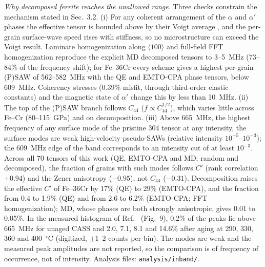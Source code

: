 \documentclass[final,3p,times]{elsarticle}
\begin{document}
\clearpage
\textit{Why decomposed ferrite reaches the unallowed range.} Three checks constrain the mechanism stated in Sec.~3.2. (i) For any coherent arrangement of the $\alpha$ and $\alpha'$ phases the effective tensor is bounded above by their Voigt average \cite{hill1952elastic}, and the per-grain surface-wave speed rises with stiffness, so no microstructure can exceed the Voigt result. Laminate homogenization along $\langle100\rangle$ \cite{backus1962long} and full-field FFT homogenization \cite{moulinec1998numerical} reproduce the explicit MD decomposed tensors to 3--5~MHz (73--84\% of the frequency shift); for Fe--36Cr every scheme gives a highest per-grain (P)SAW of 562--582~MHz with the QE and EMTO-CPA phase tensors, below 609~MHz. Coherency stresses (0.39\% misfit, through third-order elastic constants) and the magnetic state of $\alpha'$ change this by less than 10~MHz. (ii) The top of the (P)SAW branch follows $C_{44}$ ($f\propto C_{44}^{1/2}$), which varies little across Fe--Cr (80--115~GPa) and on decomposition. (iii) Above 665~MHz, the highest frequency of any surface mode of the pristine 304 tensor at any intensity, the surface modes are weak high-velocity pseudo-SAWs (relative intensity $10^{-5}$--$10^{-3}$); the 609~MHz edge of the band corresponds to an intensity cut of at least $10^{-3}$. Across all 70 tensors of this work (QE, EMTO-CPA and MD; random and decomposed), the fraction of grains with such modes follows $C'$ (rank correlation $+0.94$) and the Zener anisotropy ($-0.95$), not $C_{44}$ ($-0.31$). Decomposition raises the effective $C'$ of Fe--36Cr by 17\% (QE) to 29\% (EMTO-CPA), and the fraction from 0.4 to 1.9\% (QE) and from 2.6 to 6.2\% (EMTO-CPA; FFT homogenization); MD, whose phases are both strongly anisotropic, gives 0.01 to 0.05\%. In the measured histogram of Ref.~\cite{al2023detecting} (Fig.~9), 0.2\% of the peaks lie above 665~MHz for unaged CASS and 2.0, 7.1, 8.1 and 14.6\% after aging at 290, 330, 360 and 400~$^\circ$C (digitized, $\pm$1--2 counts per bin). The modes are weak and the measured peak amplitudes are not reported, so the comparison is of frequency of occurrence, not of intensity. Analysis files: \texttt{analysis/inband/}.
\end{document}
